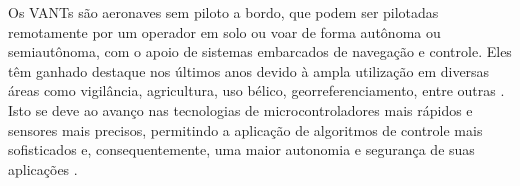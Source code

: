 %
%
%



Os \glspl{VANT} são aeronaves sem piloto a bordo, que podem ser pilotadas remotamente por um operador em solo ou voar de forma autônoma ou semiautônoma, com o apoio de sistemas embarcados de navegação e controle. Eles têm ganhado destaque nos últimos anos devido à ampla utilização em diversas áreas como vigilância, agricultura, uso bélico, georreferenciamento, entre outras \cite{Shakhatreh2019}. Isto se deve ao avanço nas tecnologias de microcontroladores mais rápidos e sensores mais precisos, permitindo a aplicação de algoritmos de controle mais sofisticados e, consequentemente, uma maior autonomia e segurança de suas aplicações \cite{Hassanalian2017}.

